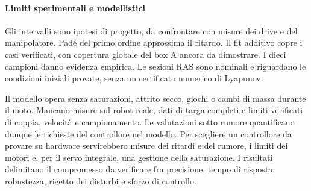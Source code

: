\paragraph*{Limiti sperimentali e modellistici}
Gli intervalli sono ipotesi di progetto, da confrontare con
misure dei drive e del manipolatore. Padé del primo ordine
approssima il ritardo. Il fit additivo copre i casi verificati,
con copertura globale del box A ancora da dimostrare.
I dieci campioni danno evidenza empirica. Le sezioni RAS sono
nominali e riguardano le condizioni iniziali provate,
senza un certificato numerico di Lyapunov.

Il modello opera senza saturazioni, attrito secco, giochi
o cambi di massa durante il moto. Mancano misure sul
robot reale, dati di targa completi e limiti verificati di
coppia, velocità e campionamento. Le valutazioni sotto
rumore quantificano dunque le richieste del controllore nel
modello. Per scegliere un controllore da provare su hardware
servirebbero misure dei ritardi e del rumore, i limiti dei
motori e, per il servo integrale, una gestione della
saturazione. I risultati delimitano il compromesso da
verificare fra precisione, tempo di risposta, robustezza,
rigetto dei disturbi e sforzo di controllo.
